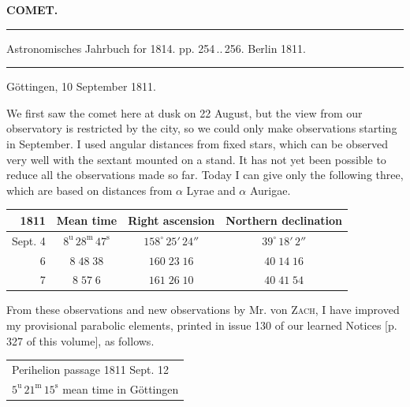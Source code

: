 \clearpage{}\hypertarget{native-338-lower}{}\label{native-338-lower}
\begin{center}\textbf{COMET.}\par\vspace{4pt}\hrule\vspace{4pt}\fontsize{10}{12}\selectfont Astronomisches Jahrbuch for 1814. pp. 254\,..\,256. Berlin 1811.\par\vspace{4pt}\hrule\vspace{4pt}\end{center}


\begin{flushright}Göttingen, 10 September 1811.\end{flushright}
\par\indent We first saw the comet here at dusk on 22 August, but the view from our observatory is restricted by the city, so we could only make observations starting in September. I used angular distances from fixed stars, which can be observed very well with the sextant mounted on a stand. It has not yet been possible to reduce all the observations made so far. Today I can give only the following three, which are based on distances from $\alpha$ Lyrae and $\alpha$ Aurigae.
\begin{center}\fontsize{10}{12}\selectfont\setlength{\tabcolsep}{4pt}\renewcommand{\arraystretch}{1.15}\begin{tabular}{r|c|c|c}
1811 & Mean time & Right ascension & Northern declination\\
\hline
Sept. 4 & $8^{\mathrm u}\,28^{\mathrm m}\,47^{\mathrm s}$ & $158^\circ\,25'\,24''$ & $39^\circ\,18'\,2''$\\
6 & $8\;48\;38$ & $160\;23\;16$ & $40\;14\;16$\\
7 & $8\;57\;6$ & $161\;26\;10$ & $40\;41\;54$\\
\end{tabular}\end{center}

\par\indent From these observations and new observations by Mr. von \textsc{Zach}, I have improved my provisional parabolic elements, printed in issue 130 of our learned Notices [p. 327 of this volume], as follows.
\begin{center}\fontsize{10}{12}\selectfont\setlength{\tabcolsep}{4pt}\renewcommand{\arraystretch}{1.15}\begin{tabular}{l}
Perihelion passage 1811 Sept. 12\\
\quad $5^{\mathrm u}\,21^{\mathrm m}\,15^{\mathrm s}$ mean time in Göttingen\\
\end{tabular}\end{center}

